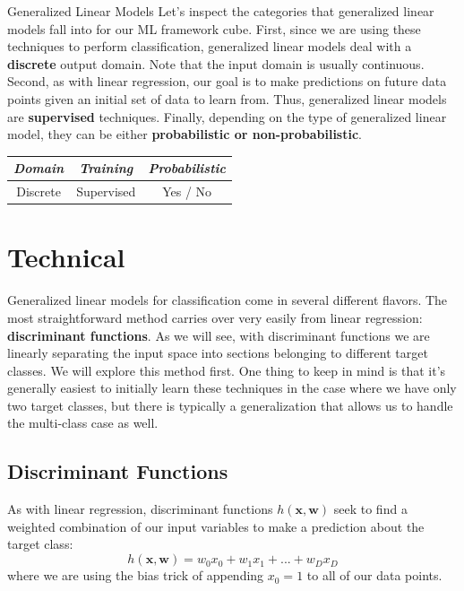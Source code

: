 \begin{mlcube}{Generalized Linear Models}
Let's inspect the categories that generalized linear models fall into for our ML framework cube. First, since we are using these techniques to perform classification, generalized linear models deal with a \textbf{discrete} output domain. Note that the input domain is usually continuous. Second, as with linear regression, our goal is to make predictions on future data points given an initial set of data to learn from. Thus, generalized linear models are \textbf{supervised} techniques. Finally, depending on the type of generalized linear model, they can be either \textbf{probabilistic or non-probabilistic}.
\begin{center}
    \begin{tabular}{c|c|c}
    \textit{\textbf{Domain}} & \textit{\textbf{Training}} & \textit{\textbf{Probabilistic}} \\
    \hline
    Discrete & Supervised & Yes / No \\
    \end{tabular}
\end{center}
\end{mlcube}

\section{Technical}
Generalized linear models for classification come in several different flavors. The most straightforward method carries over very easily from linear regression: \textbf{discriminant functions}. As we will see, with discriminant functions we are linearly separating the input space into sections belonging to different target classes. We will explore this method first. One thing to keep in mind is that it's generally easiest to initially learn these techniques in the case where we have only two target classes, but there is typically a generalization that allows us to handle the multi-class case as well.

\subsection{Discriminant Functions}
As with linear regression, discriminant functions $h(\textbf{x}, \textbf{w})$ seek to find a weighted combination of our input variables to make a prediction about the target class:
\begin{equation} \label{basic-discriminant-fn}
	h(\textbf{x}, \textbf{w}) = w_{0}x_{0} + w_{1}x_{1} + ... + w_{D}x_{D}
\end{equation}
where we are using the bias trick of appending $x_{0} = 1$ to all of our data points.

